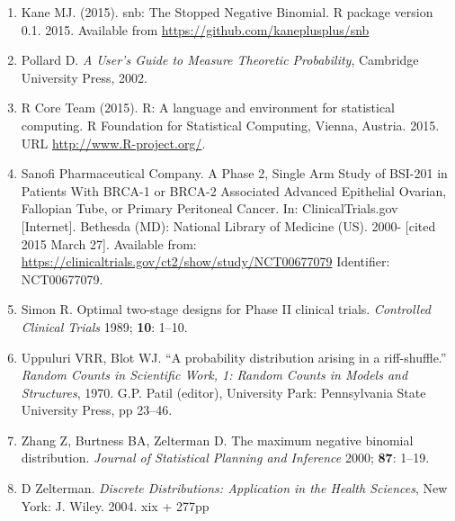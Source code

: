 \documentclass[12pt]{article}         %
\begin{document}
\begin{enumerate}

\item[\bibref{Kane 2015}]
Kane MJ. (2015). snb: The Stopped Negative Binomial. R package version 0.1. 2015. Available from \url{https://github.com/kaneplusplus/snb}

\item[\bibref{Pollard 2002}]
Pollard D. {\it A User's Guide to Measure Theoretic Probability}, 
Cambridge University Press, 2002.

\item[\bibref{R Core Team 2015}]
R Core Team (2015). R: A language and environment for statistical
computing. R Foundation for Statistical Computing, Vienna, Austria. 2015. URL \url{http://www.R-project.org/}.

\item[\bibref{Sanofi 2013}]
Sanofi Pharmaceutical Company. A Phase 2, Single Arm Study of BSI-201 in Patients With BRCA-1 or BRCA-2 Associated Advanced Epithelial Ovarian, Fallopian Tube, or Primary Peritoneal Cancer. In: ClinicalTrials.gov [Internet]. Bethesda (MD): National Library of Medicine (US). 2000- [cited 2015 March 27]. Available from: \url{https://clinicaltrials.gov/ct2/show/study/NCT00677079} Identifier: NCT00677079.

\item[\bibref{Simon 1989}]
Simon R.  Optimal two-stage designs for Phase II clinical trials. {\it Controlled Clinical Trials\/} 1989; {\bf 10}: 1--10.

\item[\bibref{Uppuluri 1970}] 
Uppuluri VRR, Blot WJ. ``A probability distribution arising in a riff-shuffle.'' {\it Random Counts  in Scientific Work, 1: Random Counts in Models and Structures}, 1970. G.P. Patil (editor), University Park: Pennsylvania State University Press, pp  23--46.

\item[\bibref{Zhang 2000}]
Zhang Z, Burtness BA, Zelterman D.  The maximum negative binomial distribution. {\em Journal of Statistical Planning and Inference\/}  2000; {\bf 87}: 1--19.

\item[\bibref{Zelterman 2004}]
D Zelterman. {\it Discrete Distributions: Application in 
the Health Sciences}, New York: J. Wiley. 2004. xix + 277pp

\end{enumerate}

\end{document}
